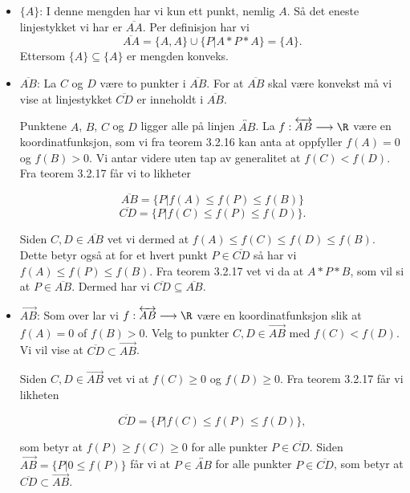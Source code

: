 \begin{oppgave}[3.3.2]
  \begin{itemize}
    \item $\{A\}$: I denne mengden har vi kun ett punkt, nemlig $A$. Så det eneste 
    linjestykket vi har er $\overline{AA}$. Per definisjon har vi 
    $$ \overline{AA} = \{A, A\}\cup \{P|A\ast P\ast A\} = \{A\}. $$
    Ettersom $\{A\}\subseteq \{A\}$ er mengden konveks. 

    \item $\overline{AB}$: La $C$ og $D$ være to punkter i $\overline{AB}$. For at $\overline{AB}$ 
    skal være konvekst må vi vise at linjestykket $\overline{CD}$ er inneholdt i $\overline{AB}$. 
    
    Punktene $A$, $B$, $C$ og $D$ ligger alle på linjen $\overleftrightarrow{AB}$. La 
    $f:\overleftrightarrow{AB}\longrightarrow \R$ være en koordinatfunksjon, som vi fra teorem 
    3.2.16 kan anta at oppfyller $f(A)=0$ og $f(B)>0$. Vi antar videre uten tap av generalitet at 
    $f(C)<f(D)$. Fra teorem 3.2.17 får vi to likheter

    $$ \overline{AB}=\{P|f(A)\leq f(P)\leq f(B)\} $$
    $$ \overline{CD}=\{P|f(C)\leq f(P)\leq f(D)\} .$$

    Siden $C, D\in \overline{AB}$ vet vi dermed at $f(A)\leq f(C)\leq f(D)\leq f(B)$. Dette betyr 
    også at for et hvert punkt $P\in \overline{CD}$ så har vi $f(A)\leq f(P)\leq f(B)$. Fra teorem
    3.2.17 vet vi da at $A\ast P\ast B$, som vil si at $P\in \overline{AB}$. Dermed har vi 
    $\overline{CD}\subseteq \overline{AB}$.  

    \item $\overrightarrow{AB}$: Som over lar vi $f:\overleftrightarrow{AB}\longrightarrow \R$ være
    en koordinatfunksjon slik at $f(A)=0$ of $f(B)>0$. Velg to punkter $C, D \in \overrightarrow{AB}$
    med $f(C)<f(D)$. Vi vil vise at $\overline{CD}\subset \overrightarrow{AB}$. 
    
    Siden $C, D\in \overrightarrow{AB}$ vet vi at $f(C)\geq 0$ og $f(D)\geq 0$. Fra teorem 3.2.17
    får vi likheten

    $$ \overline{CD} = \{P| f(C)\leq f(P)\leq f(D)\},$$

    som betyr at $f(P)\geq f(C)\geq 0$ for alle punkter $P\in \overline{CD}$. Siden 
    $\overrightarrow{AB} = \{P|0\leq f(P)\}$ får vi at $P\in \overleftrightarrow{AB}$ for alle 
    punkter $P\in \overline{CD}$, som betyr at $\overline{CD}\subset \overrightarrow{AB}$. 


\end{itemize}
\end{oppgave}
